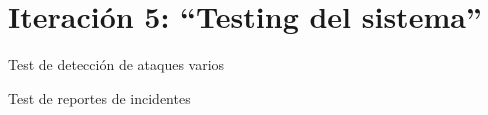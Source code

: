\chapter{Iteración 5: “Testing del sistema”}
    \begin{section}{Test de detección de ataques varios}
    \end{section}
    \begin{section}{Test de reportes de incidentes}
    \end{section}
   